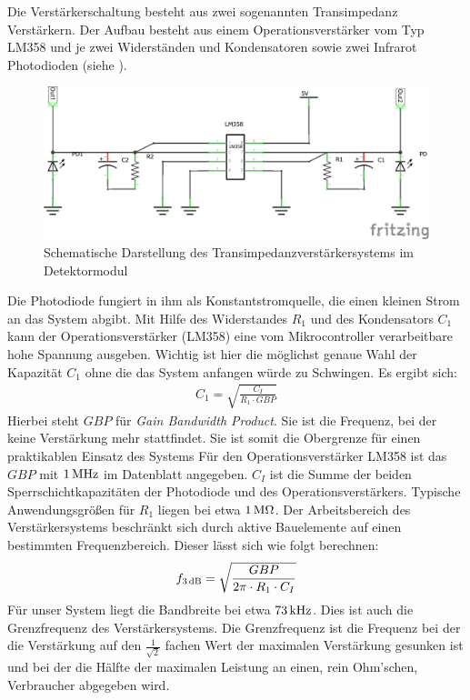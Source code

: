 Die Verstärkerschaltung besteht aus zwei sogenannten Transimpedanz Verstärkern. Der Aufbau besteht aus einem Operationsverstärker vom Typ LM358 und je zwei Widerständen und Kondensatoren sowie zwei Infrarot Photodioden (siehe ).  
\begin{figure}[h]
	\centering
	\includegraphics[scale=0.75]{../figures/Transimpedanz.png}
	\caption{Schematische Darstellung des Transimpedanzverstärkersystems im Detektormodul}
	\label{fig:Transimpedanz}
\end{figure}
Die Photodiode fungiert in ihm als Konstantstromquelle, die einen kleinen Strom an das System abgibt. Mit Hilfe des Widerstandes $R_1$ und des Kondensators $C_1$ kann der Operationsverstärker (LM358) eine vom Mikrocontroller verarbeitbare hohe Spannung ausgeben. Wichtig ist hier die möglichst genaue Wahl der Kapazität $C_1$ ohne die das System anfangen würde zu Schwingen. Es ergibt sich:
\begin{align*}
	C_1 = \sqrt{\frac{C_I}{R_1 \cdot GBP}}
\end{align*}
Hierbei steht $GBP$ für \textit{Gain Bandwidth Product}. Sie ist die Frequenz, bei der keine Verstärkung mehr stattfindet. Sie ist somit die Obergrenze für einen praktikablen Einsatz des Systems Für den Operationsverstärker LM358 ist das $GBP$ mit $\unit[1]{MHz}$ im Datenblatt angegeben. $C_I$ ist die Summe der beiden Sperrschichtkapazitäten der Photodiode und des Operationsverstärkers. Typische Anwendungsgrößen für $R_1$ liegen bei etwa $\unit[1]{M\Omega}$. Der Arbeitsbereich des Verstärkersystems beschränkt sich durch aktive Bauelemente auf einen bestimmten Frequenzbereich. Dieser lässt sich wie folgt berechnen:
\begin{align*}
	f_{\unit[3]{dB}} = \sqrt{\frac{GBP}{2\pi \cdot R_1 \cdot C_I}}
\end{align*}
Für unser System liegt die Bandbreite bei etwa $\unit[73]{kHz}$. Dies ist auch die Grenzfrequenz des Verstärkersystems. Die Grenzfrequenz ist die Frequenz bei der die Verstärkung auf den $\frac{1}{\sqrt{2}}$ fachen Wert der maximalen Verstärkung gesunken ist und bei der die Hälfte der maximalen Leistung an einen, rein Ohm'schen, Verbraucher abgegeben wird.



